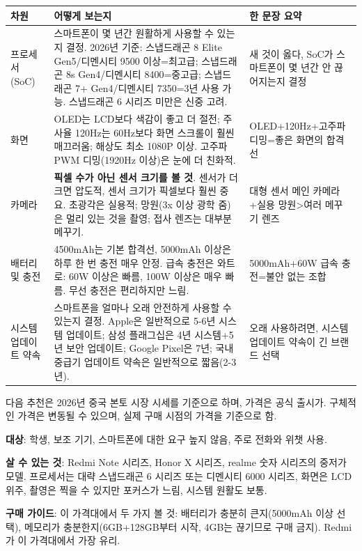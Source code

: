 \begin{center}
\begin{tabularx}{\linewidth}{|X|X|X|}
\hline
\textbf{차원} & \textbf{어떻게 보는지} & \textbf{한 문장 요약} \tabularnewline
\hline
프로세서(SoC) & 스마트폰이 몇 년간 원활하게 사용할 수 있는지 결정. 2026년 기준: 스냅드래곤 8 Elite Gen5/디멘시티 9500 이상=최고급; 스냅드래곤 8s Gen4/디멘시티 8400=중고급; 스냅드래곤 7+ Gen4/디멘시티 7350=3년 사용 가능. 스냅드래곤 6 시리즈 미만은 신중 고려. & 새 것이 옳다, SoC가 스마트폰이 몇 년간 안 끊어지는지 결정 \tabularnewline
화면 & OLED는 LCD보다 색감이 좋고 더 절전; 주사율 120Hz는 60Hz보다 화면 스크롤이 훨씬 매끄러움; 해상도 최소 1080P 이상. 고주파 PWM 디밍(1920Hz 이상)은 눈에 더 친화적. & OLED+120Hz+고주파 디밍=좋은 화면의 합격선 \tabularnewline
카메라 & \textbf{픽셀 수가 아닌 센서 크기를 볼 것}. 센서가 더 크면 압도적, 센서 크기가 픽셀보다 훨씬 중요. 초광각은 실용적; 망원(3x 이상 광학 줌)은 멀리 있는 것을 촬영; 접사 렌즈는 대부분 메꾸기. & 대형 센서 메인 카메라+실용 망원>여러 메꾸기 렌즈 \tabularnewline
배터리 및 충전 & 4500mAh는 기본 합격선, 5000mAh 이상은 하루 한 번 충전 매우 안정. 급속 충전은 와트로: 60W 이상은 빠름, 100W 이상은 매우 빠름. 무선 충전은 편리하지만 느림. & 5000mAh+60W 급속 충전=불안 없는 조합 \tabularnewline
시스템 업데이트 약속 & 스마트폰을 얼마나 오래 안전하게 사용할 수 있는지 결정. Apple은 일반적으로 5-6년 시스템 업데이트; 삼성 플래그십은 4년 시스템+5년 보안 업데이트; Google Pixel은 7년; 국내 중급기 업데이트 약속은 일반적으로 짧음(2-3년). & 오래 사용하려면, 시스템 업데이트 약속이 긴 브랜드 선택 \tabularnewline
\hline
\end{tabularx}
\end{center}


다음 추천은 2026년 중국 본토 시장 시세를 기준으로 하며, 가격은 공식 출시가. 구체적인 가격은 변동될 수 있으며, 실제 구매 시점의 가격을 기준으로 함.


\textbf{대상}: 학생, 보조 기기, 스마트폰에 대한 요구 높지 않음, 주로 전화와 위챗 사용.

\textbf{살 수 있는 것}: Redmi Note 시리즈, Honor X 시리즈, realme 숫자 시리즈의 중저가 모델. 프로세서는 대략 스냅드래곤 6 시리즈 또는 디멘시티 6000 시리즈, 화면은 LCD 위주, 촬영은 찍을 수 있지만 포커스가 느림, 시스템 원활도 보통.

\textbf{구매 가이드}: 이 가격대에서 두 가지 볼 것: 배터리가 충분히 큰지(5000mAh 이상 선택), 메모리가 충분한지(6GB+128GB부터 시작, 4GB는 끊기므로 구매 금지). Redmi가 이 가격대에서 가장 유리.

